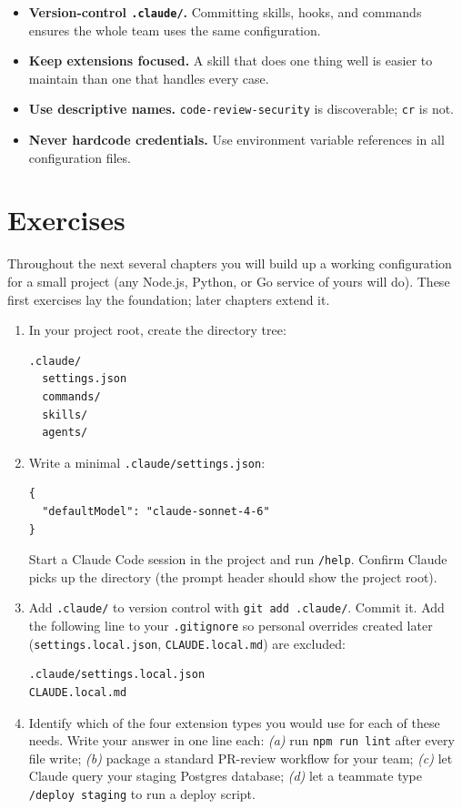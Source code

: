 \begin{itemize}
  \item \textbf{Version-control \texttt{.claude/}.} Committing skills, hooks,
        and commands ensures the whole team uses the same configuration.
  \item \textbf{Keep extensions focused.} A skill that does one thing well is
        easier to maintain than one that handles every case.
  \item \textbf{Use descriptive names.} \texttt{code-review-security} is
        discoverable; \texttt{cr} is not.
  \item \textbf{Never hardcode credentials.} Use environment variable
        references in all configuration files.
\end{itemize}

\section{Exercises}
\label{sec:plugin-exercises}

\begin{exercisebox}
Throughout the next several chapters you will build up a working
configuration for a small project (any Node.js, Python, or Go service of
yours will do). These first exercises lay the foundation; later chapters
extend it.

\begin{enumerate}
  \item In your project root, create the directory tree:
\begin{verbatim}
.claude/
  settings.json
  commands/
  skills/
  agents/
\end{verbatim}
  \item Write a minimal \texttt{.claude/settings.json}:
\begin{verbatim}
{
  "defaultModel": "claude-sonnet-4-6"
}
\end{verbatim}
        Start a Claude Code session in the project and run \texttt{/help}.
        Confirm Claude picks up the directory (the prompt header should
        show the project root).
  \item Add \texttt{.claude/} to version control with
        \texttt{git add .claude/}. Commit it. Add the following line to
        your \texttt{.gitignore} so personal overrides created later
        (\texttt{settings.local.json}, \texttt{CLAUDE.local.md}) are
        excluded:
\begin{verbatim}
.claude/settings.local.json
CLAUDE.local.md
\end{verbatim}
  \item Identify which of the four extension types you would use for each
        of these needs. Write your answer in one line each:
        \emph{(a)} run \texttt{npm run lint} after every file write;
        \emph{(b)} package a standard PR-review workflow for your team;
        \emph{(c)} let Claude query your staging Postgres database;
        \emph{(d)} let a teammate type \texttt{/deploy staging} to run a
        deploy script.
\end{enumerate}
\end{exercisebox}

